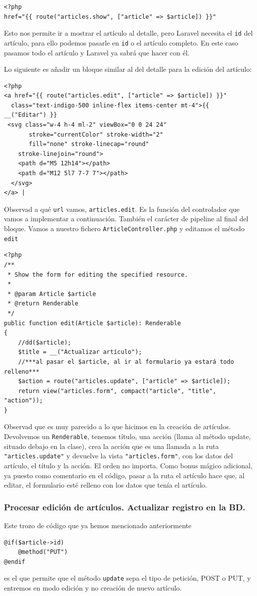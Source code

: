 \documentclass[11pt]{article}
\begin{document}
\begin{verbatim}
<?php
href="{{ route("articles.show", ["article" => $article]) }}"
\end{verbatim}
Esto nos permite ir a mostrar el artículo al detalle, pero Laravel
necesita el \texttt{id} del artículo, para ello podemos pasarle en \texttt{id} o el
artículo completo. En este caso pasamos todo el artículo y Laravel ya
sabrá que hacer con él.

Lo siguiente es añadir un bloque similar al del detalle para la
edición del artículo:
\begin{verbatim}
<?php
<a href="{{ route("articles.edit", ["article" => $article]) }}"
  class="text-indigo-500 inline-flex items-center mt-4">{{ __("Editar") }}
 <svg class="w-4 h-4 ml-2" viewBox="0 0 24 24"
       stroke="currentColor" stroke-width="2"
       fill="none" stroke-linecap="round"
    stroke-linejoin="round">
    <path d="M5 12h14"></path>
    <path d="M12 5l7 7-7 7"></path>
  </svg>
</a> |
\end{verbatim}
Observad a qué \texttt{url} vamos, \texttt{articles.edit}. Es la función del
controlador que vamos a implementar a continuación. También el
carácter de pipeline al final del bloque. Vamos a nuestro fichero
\texttt{ArticleController.php} y editamos el método \texttt{edit}
\begin{verbatim}
<?php
/**
 * Show the form for editing the specified resource.
 *
 * @param Article $article
 * @return Renderable
 */
public function edit(Article $article): Renderable
{
    //dd($article);
    $title = __("Actualizar artículo");
    //***al pasar el $article, al ir al formulario ya estará todo relleno***
    $action = route("articles.update", ["article" => $article]);
    return view("articles.form", compact("article", "title", "action"));
}
\end{verbatim}

Observad que es muy parecido a lo que hicimos en la creación de
artículos. Devolvemos un \texttt{Renderable}, tenemos título, una acción
(llama al método update, situado debajo en la clase), crea la acción
que es una llamada a la ruta \texttt{"articles.update"} y devuelve la vista
\texttt{"articles.form"}, con los datos del artículo, el título y la
acción. El orden no importa. Como bonus mágico adicional, ya puesto
como comentario en el código, pasar a la ruta el artículo hace que, al
editar, el formulario esté relleno con los datos que tenía el artículo.

\subsubsection{Procesar edición de artículos. Actualizar registro en la BD.}
\label{sec:orgeca2067}
Este trozo de código que ya hemos mencionado anteriormente
\begin{verbatim}
@if($article->id)
    @method("PUT")
@endif
\end{verbatim}
es el que permite que el método \texttt{update} sepa el tipo de petición,
POST o PUT, y entremos en modo edición y no creación de nuevo
artículo.
\end{document}
